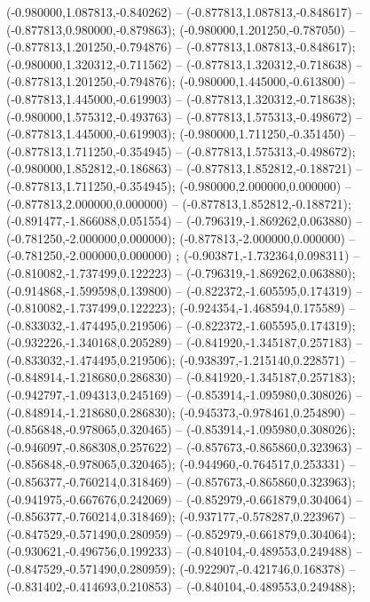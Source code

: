 (-0.980000,1.087813,-0.840262) -- (-0.877813,1.087813,-0.848617) -- (-0.877813,0.980000,-0.879863);
 (-0.980000,1.201250,-0.787050) -- (-0.877813,1.201250,-0.794876) -- (-0.877813,1.087813,-0.848617);
 (-0.980000,1.320312,-0.711562) -- (-0.877813,1.320312,-0.718638) -- (-0.877813,1.201250,-0.794876);
 (-0.980000,1.445000,-0.613800) -- (-0.877813,1.445000,-0.619903) -- (-0.877813,1.320312,-0.718638);
 (-0.980000,1.575312,-0.493763) -- (-0.877813,1.575313,-0.498672) -- (-0.877813,1.445000,-0.619903);
 (-0.980000,1.711250,-0.351450) -- (-0.877813,1.711250,-0.354945) -- (-0.877813,1.575313,-0.498672);
 (-0.980000,1.852812,-0.186863) -- (-0.877813,1.852812,-0.188721) -- (-0.877813,1.711250,-0.354945);
 (-0.980000,2.000000,0.000000) -- (-0.877813,2.000000,0.000000) -- (-0.877813,1.852812,-0.188721);
 (-0.891477,-1.866088,0.051554) -- (-0.796319,-1.869262,0.063880) -- (-0.781250,-2.000000,0.000000);
 (-0.877813,-2.000000,0.000000) -- (-0.781250,-2.000000,0.000000) ;
 (-0.903871,-1.732364,0.098311) -- (-0.810082,-1.737499,0.122223) -- (-0.796319,-1.869262,0.063880);
 (-0.914868,-1.599598,0.139800) -- (-0.822372,-1.605595,0.174319) -- (-0.810082,-1.737499,0.122223);
 (-0.924354,-1.468594,0.175589) -- (-0.833032,-1.474495,0.219506) -- (-0.822372,-1.605595,0.174319);
 (-0.932226,-1.340168,0.205289) -- (-0.841920,-1.345187,0.257183) -- (-0.833032,-1.474495,0.219506);
 (-0.938397,-1.215140,0.228571) -- (-0.848914,-1.218680,0.286830) -- (-0.841920,-1.345187,0.257183);
 (-0.942797,-1.094313,0.245169) -- (-0.853914,-1.095980,0.308026) -- (-0.848914,-1.218680,0.286830);
 (-0.945373,-0.978461,0.254890) -- (-0.856848,-0.978065,0.320465) -- (-0.853914,-1.095980,0.308026);
 (-0.946097,-0.868308,0.257622) -- (-0.857673,-0.865860,0.323963) -- (-0.856848,-0.978065,0.320465);
 (-0.944960,-0.764517,0.253331) -- (-0.856377,-0.760214,0.318469) -- (-0.857673,-0.865860,0.323963);
 (-0.941975,-0.667676,0.242069) -- (-0.852979,-0.661879,0.304064) -- (-0.856377,-0.760214,0.318469);
 (-0.937177,-0.578287,0.223967) -- (-0.847529,-0.571490,0.280959) -- (-0.852979,-0.661879,0.304064);
 (-0.930621,-0.496756,0.199233) -- (-0.840104,-0.489553,0.249488) -- (-0.847529,-0.571490,0.280959);
 (-0.922907,-0.421746,0.168378) -- (-0.831402,-0.414693,0.210853) -- (-0.840104,-0.489553,0.249488);

